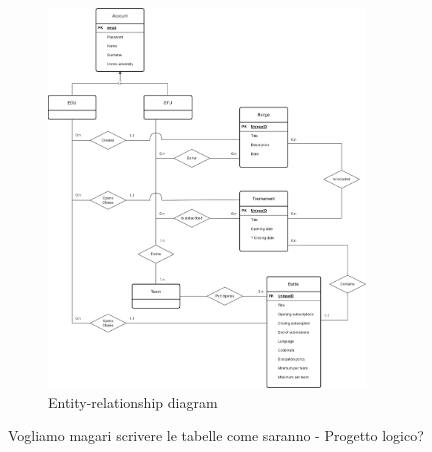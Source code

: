 \begin{figure}[H]
    \centering
    \includegraphics[width=0.75\textwidth]{images/diagrams/er_diagram.png}
    \caption{Entity-relationship diagram}
    \label{fig:er_diagram}
\end{figure}

{\color{red} Vogliamo magari scrivere le tabelle come saranno - Progetto logico? \\}


